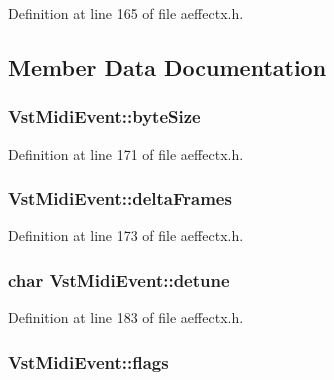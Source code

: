 Definition at line 165 of file aeffectx.\+h.



\subsection{Member Data Documentation}
\subsubsection[{\texorpdfstring{byte\+Size}{byteSize}}]{ Vst\+Midi\+Event\+::byte\+Size}\hypertarget{class_vst_midi_event_ae7e599f228fd376cb8a19dc16fb45526}{}\label{class_vst_midi_event_ae7e599f228fd376cb8a19dc16fb45526}


Definition at line 171 of file aeffectx.\+h.

\subsubsection[{\texorpdfstring{delta\+Frames}{deltaFrames}}]{ Vst\+Midi\+Event\+::delta\+Frames}\hypertarget{class_vst_midi_event_a9e3e980ea154602b7ad40205b11eb156}{}\label{class_vst_midi_event_a9e3e980ea154602b7ad40205b11eb156}


Definition at line 173 of file aeffectx.\+h.

\subsubsection[{\texorpdfstring{detune}{detune}}]{\setlength{\rightskip}{0pt plus 5cm}char Vst\+Midi\+Event\+::detune}\hypertarget{class_vst_midi_event_af2123571b8c0a2d763ae005581583cd7}{}\label{class_vst_midi_event_af2123571b8c0a2d763ae005581583cd7}


Definition at line 183 of file aeffectx.\+h.

\subsubsection[{\texorpdfstring{flags}{flags}}]{ Vst\+Midi\+Event\+::flags}\hypertarget{class_vst_midi_event_a956b59b1d71141d3b01392fcfc07edc3}{}\label{class_vst_midi_event_a956b59b1d71141d3b01392fcfc07edc3}


